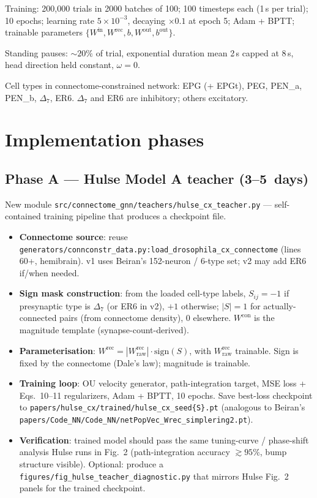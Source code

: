 \documentclass[11pt]{article}
\begin{document}
Training: 200{,}000 trials in 2000 batches of 100; 100 timesteps each
(1\,s per trial); 10 epochs; learning rate $5\times 10^{-3}$, decaying
$\times 0.1$ at epoch 5; Adam + BPTT; trainable parameters
$\{W^{\text{in}},W^{\text{rec}},b,W^{\text{out}},b^{\text{out}}\}$.

Standing pauses: $\sim 20\%$ of trial, exponential duration mean 2\,s
capped at 8\,s, head direction held constant, $\omega=0$.

Cell types in connectome-constrained network: EPG (+ EPGt), PEG, PEN\_a,
PEN\_b, $\Delta_7$, ER6. $\Delta_7$ and ER6 are inhibitory; others
excitatory.

\section{Implementation phases}

\subsection*{Phase A --- Hulse Model A teacher (3--5~days)}

New module \texttt{src/connectome\_gnn/teachers/hulse\_cx\_teacher.py} ---
self-contained training pipeline that produces a checkpoint file.

\begin{itemize}[leftmargin=*]
\item \textbf{Connectome source}: reuse
  \texttt{generators/connconstr\_data.py:load\_drosophila\_cx\_connectome}
  (lines 60+, hemibrain). v1 uses Beiran's 152-neuron / 6-type set;
  v2 may add ER6 if/when needed.
\item \textbf{Sign mask construction}: from the loaded cell-type labels,
  $S_{ij} = -1$ if presynaptic type is $\Delta_7$ (or ER6 in v2), $+1$
  otherwise; $|S| = 1$ for actually-connected pairs (from connectome
  density), 0 elsewhere. $W^{\text{con}}$ is the magnitude template
  (synapse-count-derived).
\item \textbf{Parameterisation}: $W^{\text{rec}} = |W^{\text{rec}}_{\text{raw}}|
  \cdot \mathrm{sign}(S)$, with $W^{\text{rec}}_{\text{raw}}$ trainable.
  Sign is fixed by the connectome (Dale's law); magnitude is trainable.
\item \textbf{Training loop}: OU velocity generator, path-integration
  target, MSE loss + Eqs.~10--11 regularizers, Adam + BPTT, 10 epochs.
  Save best-loss checkpoint to
  \texttt{papers/hulse\_cx/trained/hulse\_cx\_seed\{S\}.pt} (analogous to
  Beiran's \texttt{papers/Code\_NN/Code\_NN/netPopVec\_Wrec\_simplering2.pt}).
\item \textbf{Verification}: trained model should pass the same tuning-curve
  / phase-shift analysis Hulse runs in Fig.~2 (path-integration accuracy
  $\gtrsim 95\%$, bump structure visible). Optional: produce a
  \texttt{figures/fig\_hulse\_teacher\_diagnostic.py} that mirrors Hulse
  Fig.~2 panels for the trained checkpoint.
\end{itemize}
\end{document}
